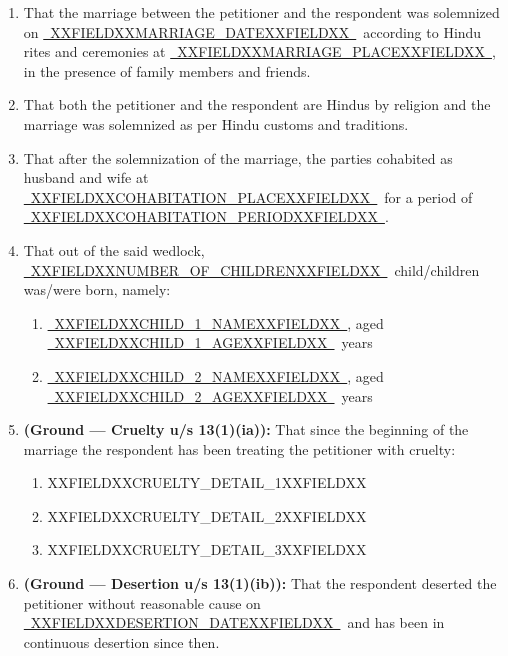 \documentclass[12pt,a4paper]{article}
\newcommand{\fillline}[1]{\underline{~#1~}}
\begin{document}
\begin{enumerate}[leftmargin=*, label=\arabic{enumi}., itemsep=10pt, topsep=2pt]

  \item That the marriage between the petitioner and the respondent was
        solemnized on \fillline{XXFIELDXXMARRIAGE_DATEXXFIELDXX}\ according to Hindu rites and ceremonies
        at \fillline{XXFIELDXXMARRIAGE_PLACEXXFIELDXX}, in the presence of family members and friends.

  \item That both the petitioner and the respondent are Hindus by religion
        and the marriage was solemnized as per Hindu customs and traditions.

  \item That after the solemnization of the marriage, the parties cohabited
        as husband and wife at \fillline{XXFIELDXXCOHABITATION_PLACEXXFIELDXX}\ for a period of
        \fillline{XXFIELDXXCOHABITATION_PERIODXXFIELDXX}.

  \item That out of the said wedlock, \fillline{XXFIELDXXNUMBER_OF_CHILDRENXXFIELDXX}\ child/children
        was/were born, namely:
        \begin{enumerate}[label=(\alph*), itemsep=4pt]
          \item \fillline{XXFIELDXXCHILD_1_NAMEXXFIELDXX}, aged \fillline{XXFIELDXXCHILD_1_AGEXXFIELDXX}\ years
          \item \fillline{XXFIELDXXCHILD_2_NAMEXXFIELDXX}, aged \fillline{XXFIELDXXCHILD_2_AGEXXFIELDXX}\ years
        \end{enumerate}

  \item \textbf{(Ground --- Cruelty u/s 13(1)(ia)):}
        That since the beginning of the marriage the respondent has been
        treating the petitioner with cruelty:
        \begin{enumerate}[label=(\roman*), itemsep=4pt]
          \item XXFIELDXXCRUELTY_DETAIL_1XXFIELDXX
          \item XXFIELDXXCRUELTY_DETAIL_2XXFIELDXX
          \item XXFIELDXXCRUELTY_DETAIL_3XXFIELDXX
        \end{enumerate}

  \item \textbf{(Ground --- Desertion u/s 13(1)(ib)):}
        That the respondent deserted the petitioner without reasonable cause
        on \fillline{XXFIELDXXDESERTION_DATEXXFIELDXX}\ and has been in continuous desertion since then.


\end{enumerate}
\end{document}
